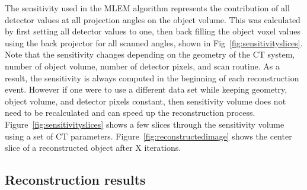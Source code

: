The sensitivity used in the MLEM algorithm represents the contribution of all detector values at all projection angles on the object volume.  This was calculated by first setting all detector values to one, then back filling the object voxel values using the back projector for all scanned angles, shown in Fig~\ref{fig:sensitivityslices}.  Note that the sensitivity changes depending on the geometry of the CT system, number of object volume, number of detector pixels, and scan routine.  As a result, the sensitivity is always computed in the beginning of each reconstruction event.  However if one were to use a different data set while keeping geometry, object volume, and detector pixels constant, then sensitivity volume does not need to be recalculated and can speed up the reconstruction process.  Figure~\ref{fig:sensitivityslices} shows a few slices through the sensitivity volume using a set of CT parameters.
Figure~\ref{fig:reconstructedimage} shows the center slice of a reconstructed object after X iterations.

\subsection{Reconstruction results}

%




